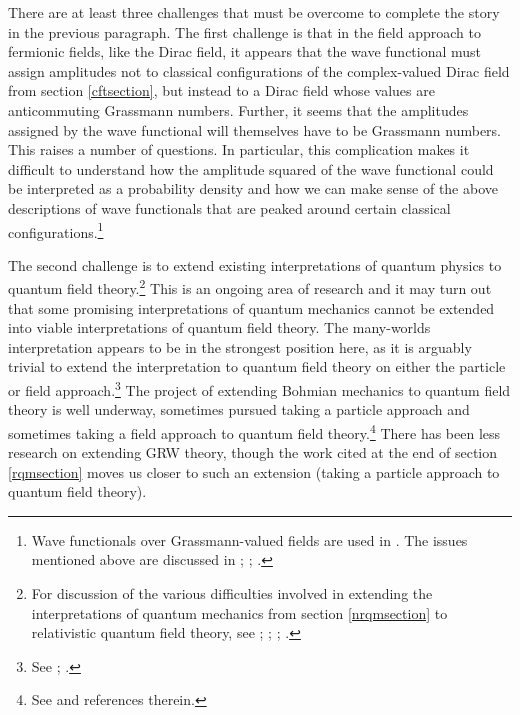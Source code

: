 \documentclass[12pt,secnumarabic,amsmath,amssymb,balancelastpage,nofootinbib]{article}
\begin{document}
There are at least three challenges that must be overcome to complete the story in the previous paragraph.  The first challenge is that in the field approach to fermionic fields, like the Dirac field, it appears that the wave functional must assign amplitudes not to classical configurations of the complex-valued Dirac field from section \ref{cftsection}, but instead to a Dirac field whose values are anticommuting Grassmann numbers.  Further, it seems that the amplitudes assigned by the wave functional will themselves have to be Grassmann numbers.  This raises a number of questions.  In particular, this complication makes it difficult to understand how the amplitude squared of the wave functional could be interpreted as a probability density and how we can make sense of the above descriptions of wave functionals that are peaked around certain classical configurations.\footnote{Wave functionals over Grassmann-valued fields are used in \citet{floreanini1988, jackiw1990, hatfield, valentini1992, valentini1996}.  The issues mentioned above are discussed in \citet[sec.\ 9.2]{struyve2010}; \citet[sec.\ 3.3]{struyve2011}; \citet[appendix A]{positrons}.}

The second challenge is to extend existing interpretations of quantum physics to quantum field theory.\footnote{For discussion of the various difficulties involved in extending the interpretations of quantum mechanics from section \ref{nrqmsection} to relativistic quantum field theory, see \citet{wallace2008}; \citet{barrett2014}; \citet[ch.\ 7]{maudlinQM}; \citet[ch.\ 11--12]{durr2020}.}  This is an ongoing area of research and it may turn out that some promising interpretations of quantum mechanics cannot be extended into viable interpretations of quantum field theory.  The many-worlds interpretation appears to be in the strongest position here, as it is arguably trivial to extend the interpretation to quantum field theory on either the particle or field approach.\footnote{See \citet{wallace2008, wallace2018, wallace2020}; \citet[sec.\ 1.7]{wallaceQM}.}  The project of extending Bohmian mechanics to quantum field theory is well underway, sometimes pursued taking a particle approach and sometimes taking a field approach to quantum field theory.\footnote{See \citet{struyve2010, struyve2011, tumulka2018} and references therein.}  There has been less research on extending GRW theory, though the work cited at the end of section \ref{rqmsection} moves us closer to such an extension (taking a particle approach to quantum field theory).
\end{document}
